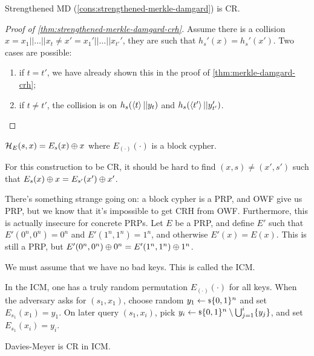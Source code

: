 \begin{theorem} \label{thm:strengthened-merkle-damgard-crh}
	Strengthened \ac{MD} (\cref{cons:strengthened-merkle-damgard}) is \ac{CR}.
\end{theorem}

\begin{proof}[Proof of \cref{thm:strengthened-merkle-damgard-crh}]
	Assume there is a collision $x = x_1 || \dots || x_t \neq x' = x_1' || \dots || x_{t'}'$, \ie they are such that $h_s'(x) = h_s'(x')$.
	Two cases are possible:
	\begin{enumerate}
		\item if $t = t'$, we have already shown this in the proof of \cref{thm:merkle-damgard-crh};
		\item if $t \neq t'$, the collision is on $h_s(\left< {t} \right> || y_t)$ and $h_s(\left< {t'} \right> || y_{t'}')$. \qedhere
	\end{enumerate}
\end{proof}

\begin{construction}
	$\mathcal{H}_E(s,x) = E_s(x) \oplus x$ where $E_{(\cdot)} (\cdot)$ is a block cypher.
\end{construction}
For this construction to be \ac{CR}, it should be hard to find $(x,s) \neq (x',s')$ such that $E_{s}(x) \oplus x = E_{s'}(x') \oplus x'$.

There's something strange going on: a block cypher is a \ac{PRP}, and \ac{OWF} give us \ac{PRP}, but we know that it's impossible to get \ac{CRH} from \ac{OWF}.
Furthermore, this is actually insecure for concrete \acp{PRP}.
Let $E$ be a \ac{PRP}, and define $E'$ such that $E'(0^n, 0^n) = 0^n$ and $E'(1^n, 1^n) = 1^n$, and otherwise $E'(x) = E(x)$.
This is still a \ac{PRP}, but $E'(0^n, 0^n) \oplus 0^n = E'(1^n, 1^n) \oplus 1^n$.

We must assume that we have no bad keys.
This is called the \ac{ICM}.

In the \ac{ICM}, one has a truly random permutation $E_{(\cdot)}(\cdot)$ for all keys.
When the adversary asks for $(s_1, x_1)$, choose random $y_1 \leftarrow {\scriptstyle \$} {\{0,1\}^n}$ and set $E_{s_1}(x_1) = y_1$.
On later query $(s_1,x_i)$, pick $y_i \leftarrow {\scriptstyle \$} {\{0,1\}^{n} \setminus \bigcup_{j=1}^{i} \{y_j\}}$, and set $E_{s_1} (x_i) =  y_i$.

\begin{theorem} \label{thm:davies-meyer-cr-icm}
	Davies-Meyer is \ac{CR} in \ac{ICM}.
\end{theorem}

